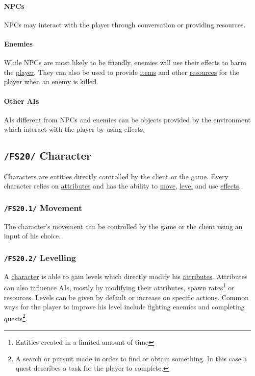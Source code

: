 \documentclass[11pt]{article}
\begin{document}
\paragraph{NPCs}
NPCs may interact with the player through conversation or providing resources.
\paragraph{Enemies}
While NPCs are most likely to be friendly, enemies will use their effects to harm the \hyperref[subsec:fs60player]{player}.
They can also be used to provide \hyperref[subsec:fs41items]{items} and other \hyperref[subsec:fs40resources]{resources} for the player when an enemy is killed.
\paragraph{Other AIs}
AIs different from NPCs and enemies can be objects provided by the environment which interact with the player by using effects.
\subsection{\texttt{/FS20/} Character}\label{subsec:fs20character}
Characters are entities directly controlled by the client or the game. 
Every character relies on \hyperref[subsec:fs50attributes]{attributes} and has the ability to \hyperref[subsec:fs201movement]{move}, \hyperref[subsec:fs202levelling]{level} and use \hyperref[subsec:fs30effects]{effects}.
\subsubsection{\texttt{/FS20.1/} Movement}\label{subsec:fs201movement}
The character's movement can be controlled by the game or the client using an input of his choice.
\subsubsection{\texttt{/FS20.2/} Levelling}\label{subsec:fs202levelling}
A \hyperref[subsec:fs20character]{character} is able to gain levels which directly modify his \hyperref[subsec:fs50attributes]{attributes}.
Attributes can also influence AIs, mostly by modifying their attributes, spawn rates\footnote{Entities created in a limited amount of time} or resources.
Levels can be given by default or increase on specific actions. Common ways for the player to improve his level include fighting enemies and completing quests\footnote{A search or pursuit made in order to find or obtain something. In this case a quest describes a task for the player to complete.}.
\end{document}
